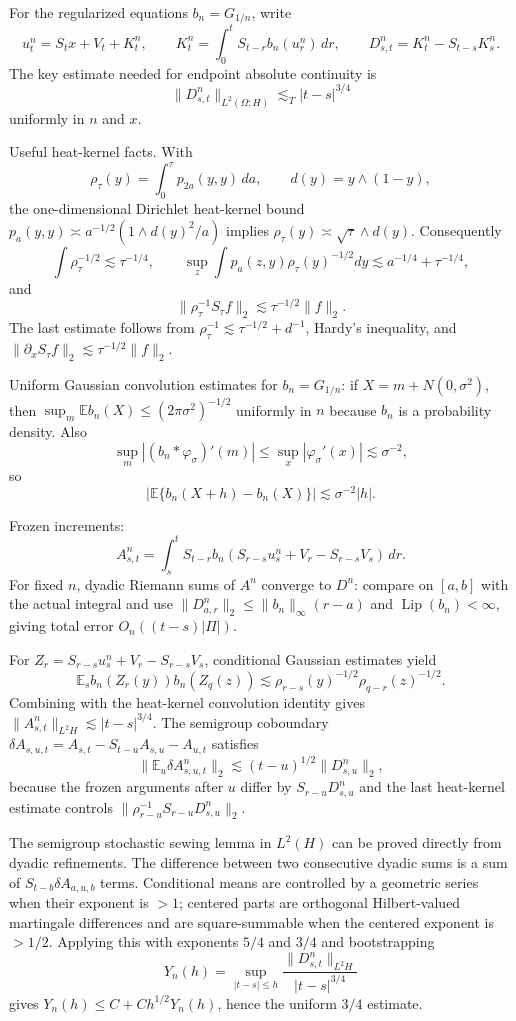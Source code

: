\documentclass[12pt]{article}
\newcommand{\E}{\mathbb E}
\begin{document}
For the regularized equations $b_n=G_{1/n}$, write
\[
u_t^n=S_tx+V_t+K_t^n,\qquad
K_t^n=\int_0^tS_{t-r}b_n(u_r^n)\,dr,\qquad
D^n_{s,t}=K_t^n-S_{t-s}K_s^n .
\]
The key estimate needed for endpoint absolute continuity is
\[
\|D^n_{s,t}\|_{L^2(\Omega;H)}\lesssim_T |t-s|^{3/4}
\]
uniformly in $n$ and $x$.

Useful heat-kernel facts.  With
\[
\rho_\tau(y)=\int_0^\tau p_{2a}(y,y)\,da,\qquad d(y)=y\wedge(1-y),
\]
the one-dimensional Dirichlet heat-kernel bound
$p_a(y,y)\asymp a^{-1/2}(1\wedge d(y)^2/a)$ implies
$\rho_\tau(y)\asymp \sqrt{\tau}\wedge d(y)$.  Consequently
\[
\int\rho_\tau^{-1/2}\lesssim \tau^{-1/4},\qquad
\sup_z\int p_a(z,y)\rho_\tau(y)^{-1/2}dy
  \lesssim a^{-1/4}+\tau^{-1/4},
\]
and
\[
\|\rho_\tau^{-1}S_\tau f\|_2\lesssim \tau^{-1/2}\|f\|_2.
\]
The last estimate follows from $\rho_\tau^{-1}\lesssim\tau^{-1/2}+d^{-1}$,
Hardy's inequality, and $\|\partial_xS_\tau f\|_2\lesssim\tau^{-1/2}\|f\|_2$.

Uniform Gaussian convolution estimates for $b_n=G_{1/n}$:
if $X=m+N(0,\sigma^2)$, then
$\sup_m\E b_n(X)\le (2\pi\sigma^2)^{-1/2}$ uniformly in $n$ because $b_n$ is
a probability density.  Also
\[
\sup_m |(b_n*\varphi_\sigma)'(m)|
   \le \sup_x|\varphi_\sigma'(x)|\lesssim\sigma^{-2},
\]
so
\[
|\E\{b_n(X+h)-b_n(X)\}|\lesssim \sigma^{-2}|h|.
\]

Frozen increments:
\[
A^n_{s,t}=\int_s^tS_{t-r}
 b_n(S_{r-s}u_s^n+V_r-S_{r-s}V_s)\,dr .
\]
For fixed $n$, dyadic Riemann sums of $A^n$ converge to $D^n$: compare on
$[a,b]$ with the actual integral and use
$\|D^n_{a,r}\|_2\le \|b_n\|_\infty(r-a)$ and $\operatorname{Lip}(b_n)<\infty$,
giving total error $O_n((t-s)|\Pi|)$.

For $Z_r=S_{r-s}u_s^n+V_r-S_{r-s}V_s$, conditional Gaussian estimates yield
\[
\E_s b_n(Z_r(y))b_n(Z_q(z))
\lesssim
\rho_{r-s}(y)^{-1/2}\rho_{q-r}(z)^{-1/2}.
\]
Combining with the heat-kernel convolution identity gives
$\|A^n_{s,t}\|_{L^2H}\lesssim |t-s|^{3/4}$.  The semigroup coboundary
$\delta A_{s,u,t}=A_{s,t}-S_{t-u}A_{s,u}-A_{u,t}$ satisfies
\[
\|\E_u\delta A^n_{s,u,t}\|_2
 \lesssim (t-u)^{1/2}\|D^n_{s,u}\|_2,
\]
because the frozen arguments after $u$ differ by $S_{r-u}D^n_{s,u}$ and the
last heat-kernel estimate controls
$\|\rho_{r-u}^{-1}S_{r-u}D^n_{s,u}\|_2$.

The semigroup stochastic sewing lemma in $L^2(H)$ can be proved directly from
dyadic refinements.  The difference between two consecutive dyadic sums is a
sum of $S_{t-b}\delta A_{a,u,b}$ terms.  Conditional means are controlled by a
geometric series when their exponent is $>1$; centered parts are orthogonal
Hilbert-valued martingale differences and are square-summable when the
centered exponent is $>1/2$.  Applying this with exponents $5/4$ and $3/4$
and bootstrapping
\[
Y_n(h)=\sup_{|t-s|\le h}\frac{\|D^n_{s,t}\|_{L^2H}}{|t-s|^{3/4}}
\]
gives $Y_n(h)\le C+Ch^{1/2}Y_n(h)$, hence the uniform $3/4$ estimate.
\end{document}

